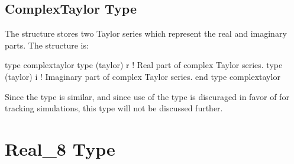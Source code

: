 \documentclass{hitec}     %
\newcommand{\Section}[1]{\section{#1}\vspace*{-1ex}}
\begin{document}
\subsection{ComplexTaylor Type}
\label{s:taylor}

The  structure stores two Taylor series which represent the real and imaginary parts.
The structure is:
\begin{code}
type complextaylor
   type (taylor) r     ! Real part of complex Taylor series.
   type (taylor) i     ! Imaginary part of complex Taylor series.
end type complextaylor
\end{code}
Since the  type is similar, and since use
of the  type is discuraged in favor of  for tracking simulations, this type will not
be discussed further.

\Section{Real_8 Type}
\label{s:real.8}
\end{document}
